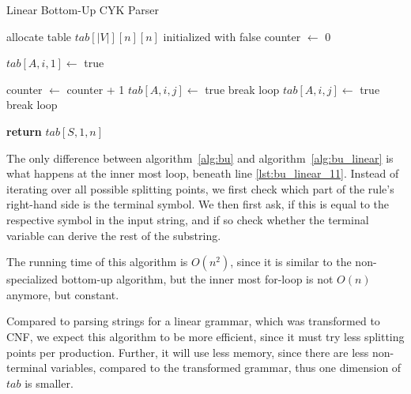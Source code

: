 \begin{algorithm}[H]
    \caption{Linear Bottom-Up CYK Parser}
    \label{alg:bu_linear}
    \begin{algorithmic}[1]
        \State allocate table $tab[|V|][n][n]$ initialized with false
        \State counter $\leftarrow$ 0
    
                \State $tab[A,i,1] \leftarrow$ true
            \EndFor
        \EndFor

                    \State counter $\leftarrow$ counter + 1 \label{lst:bu_linear_11}
                            \State $tab[A,i,j]\leftarrow$ true
                            \State break loop
                        \EndIf
                    \Else
                            \State $tab[A,i,j]\leftarrow$ true
                            \State break loop
                        \EndIf
                    \EndIf
                \EndFor
            \EndFor
        \EndFor

        \State \textbf{return} $tab[S,1,n]$
        \EndFunction
    \end{algorithmic}
\end{algorithm}

The only difference between algorithm~\ref{alg:bu} and algorithm~\ref{alg:bu_linear} is what happens at the inner most loop, beneath line \ref{lst:bu_linear_11}.
Instead of iterating over all possible splitting points, we first check which part of the rule's right-hand side is the terminal symbol.
We then first ask, if this is equal to the respective symbol in the input string, and if so check whether the terminal variable can derive the rest of the substring.

The running time of this algorithm is $O(n^2)$, since it is similar to the non-specialized bottom-up algorithm, but the inner most for-loop is not $O(n)$ anymore, but constant.

Compared to parsing strings for a linear grammar, which was transformed to CNF, we expect this algorithm to be more efficient, since it must try less splitting points per production.
Further, it will use less memory, since there are less non-terminal variables, compared to the transformed grammar, thus one dimension of $tab$ is smaller.

